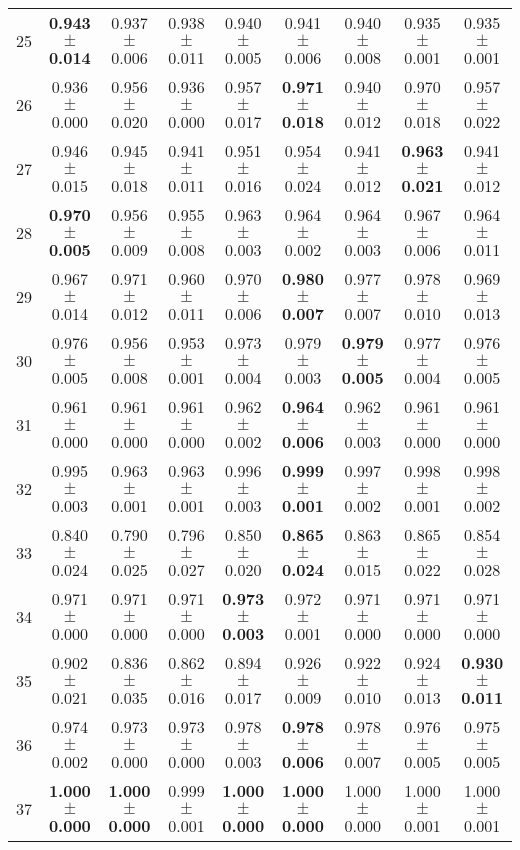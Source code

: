 \begin{table}[!ht]
{\begin{tabular}{r c c c c c c c c}
25 & \textbf{0.943 $\pm$ 0.014} & 0.937 $\pm$ 0.006 & 0.938 $\pm$ 0.011 & 0.940 $\pm$ 0.005 & 0.941 $\pm$ 0.006 & 0.940 $\pm$ 0.008 & 0.935 $\pm$ 0.001 & 0.935 $\pm$ 0.001 \\
26 & 0.936 $\pm$ 0.000 & 0.956 $\pm$ 0.020 & 0.936 $\pm$ 0.000 & 0.957 $\pm$ 0.017 & \textbf{0.971 $\pm$ 0.018} & 0.940 $\pm$ 0.012 & 0.970 $\pm$ 0.018 & 0.957 $\pm$ 0.022 \\
27 & 0.946 $\pm$ 0.015 & 0.945 $\pm$ 0.018 & 0.941 $\pm$ 0.011 & 0.951 $\pm$ 0.016 & 0.954 $\pm$ 0.024 & 0.941 $\pm$ 0.012 & \textbf{0.963 $\pm$ 0.021} & 0.941 $\pm$ 0.012 \\
28 & \textbf{0.970 $\pm$ 0.005} & 0.956 $\pm$ 0.009 & 0.955 $\pm$ 0.008 & 0.963 $\pm$ 0.003 & 0.964 $\pm$ 0.002 & 0.964 $\pm$ 0.003 & 0.967 $\pm$ 0.006 & 0.964 $\pm$ 0.011 \\
29 & 0.967 $\pm$ 0.014 & 0.971 $\pm$ 0.012 & 0.960 $\pm$ 0.011 & 0.970 $\pm$ 0.006 & \textbf{0.980 $\pm$ 0.007} & 0.977 $\pm$ 0.007 & 0.978 $\pm$ 0.010 & 0.969 $\pm$ 0.013 \\
30 & 0.976 $\pm$ 0.005 & 0.956 $\pm$ 0.008 & 0.953 $\pm$ 0.001 & 0.973 $\pm$ 0.004 & 0.979 $\pm$ 0.003 & \textbf{0.979 $\pm$ 0.005} & 0.977 $\pm$ 0.004 & 0.976 $\pm$ 0.005 \\
31 & 0.961 $\pm$ 0.000 & 0.961 $\pm$ 0.000 & 0.961 $\pm$ 0.000 & 0.962 $\pm$ 0.002 & \textbf{0.964 $\pm$ 0.006} & 0.962 $\pm$ 0.003 & 0.961 $\pm$ 0.000 & 0.961 $\pm$ 0.000 \\
32 & 0.995 $\pm$ 0.003 & 0.963 $\pm$ 0.001 & 0.963 $\pm$ 0.001 & 0.996 $\pm$ 0.003 & \textbf{0.999 $\pm$ 0.001} & 0.997 $\pm$ 0.002 & 0.998 $\pm$ 0.001 & 0.998 $\pm$ 0.002 \\
33 & 0.840 $\pm$ 0.024 & 0.790 $\pm$ 0.025 & 0.796 $\pm$ 0.027 & 0.850 $\pm$ 0.020 & \textbf{0.865 $\pm$ 0.024} & 0.863 $\pm$ 0.015 & 0.865 $\pm$ 0.022 & 0.854 $\pm$ 0.028 \\
34 & 0.971 $\pm$ 0.000 & 0.971 $\pm$ 0.000 & 0.971 $\pm$ 0.000 & \textbf{0.973 $\pm$ 0.003} & 0.972 $\pm$ 0.001 & 0.971 $\pm$ 0.000 & 0.971 $\pm$ 0.000 & 0.971 $\pm$ 0.000 \\
35 & 0.902 $\pm$ 0.021 & 0.836 $\pm$ 0.035 & 0.862 $\pm$ 0.016 & 0.894 $\pm$ 0.017 & 0.926 $\pm$ 0.009 & 0.922 $\pm$ 0.010 & 0.924 $\pm$ 0.013 & \textbf{0.930 $\pm$ 0.011} \\
36 & 0.974 $\pm$ 0.002 & 0.973 $\pm$ 0.000 & 0.973 $\pm$ 0.000 & 0.978 $\pm$ 0.003 & \textbf{0.978 $\pm$ 0.006} & 0.978 $\pm$ 0.007 & 0.976 $\pm$ 0.005 & 0.975 $\pm$ 0.005 \\
37 & \textbf{1.000 $\pm$ 0.000} & \textbf{1.000 $\pm$ 0.000} & 0.999 $\pm$ 0.001 & \textbf{1.000 $\pm$ 0.000} & \textbf{1.000 $\pm$ 0.000} & 1.000 $\pm$ 0.000 & 1.000 $\pm$ 0.001 & 1.000 $\pm$ 0.001 \\

\end{tabular}}
\end{table}
